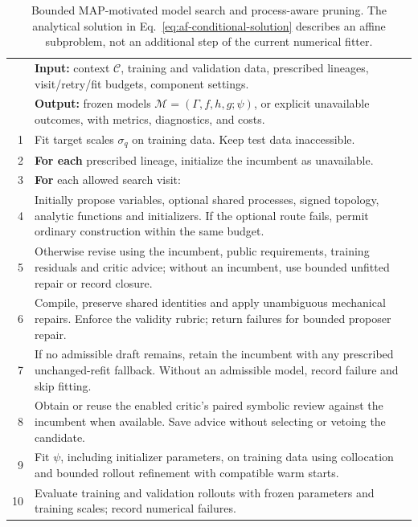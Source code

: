 \begin{table}[!htbp]
\centering
\caption{Bounded MAP-motivated model search and process-aware pruning.
The analytical solution in Eq.~\eqref{eq:af-conditional-solution} describes
an affine subproblem, not an additional step of the current numerical fitter.}
\label{tab:af-algorithm}
\small
\renewcommand{\arraystretch}{1.14}
\begin{tabularx}{\textwidth}{@{}rX@{}}
\toprule
 & \textbf{Input:} context $\mathcal C$, training and validation data,
 prescribed lineages, visit/retry/fit budgets, component settings.\\
 & \textbf{Output:} frozen models $\mathcal M=(\Gamma,f,h,g;\psi)$,
 or explicit unavailable outcomes, with metrics, diagnostics, and costs.\\
\midrule
1 & Fit target scales $\sigma_q$ on training data. Keep test data inaccessible.\\
2 & \textbf{For each} prescribed lineage, initialize the incumbent as unavailable.\\
3 & \quad \textbf{For} each allowed search visit:\\
4 & \qquad Initially propose variables, optional shared processes, signed
 topology, analytic functions and initializers. If the optional route fails,
 permit ordinary construction within the same budget.\\
5 & \qquad Otherwise revise using the incumbent, public requirements,
 training residuals and critic advice; without an incumbent, use bounded
 unfitted repair or record closure.\\
6 & \qquad Compile, preserve shared identities and apply unambiguous
 mechanical repairs. Enforce the validity rubric; return failures for
 bounded proposer repair.\\
7 & \qquad If no admissible draft remains, retain the incumbent with any
 prescribed unchanged-refit fallback. Without an admissible model, record
 failure and skip fitting.\\
8 & \qquad Obtain or reuse the enabled critic's paired symbolic review
 against the incumbent when available. Save advice without selecting or
 vetoing the candidate.\\
9 & \qquad Fit $\psi$, including initializer parameters, on training data
 using collocation and bounded rollout refinement with compatible warm starts.\\
10 & \qquad Evaluate training and validation rollouts with frozen parameters
 and training scales; record numerical failures.\\

\end{tabularx}
\end{table}
